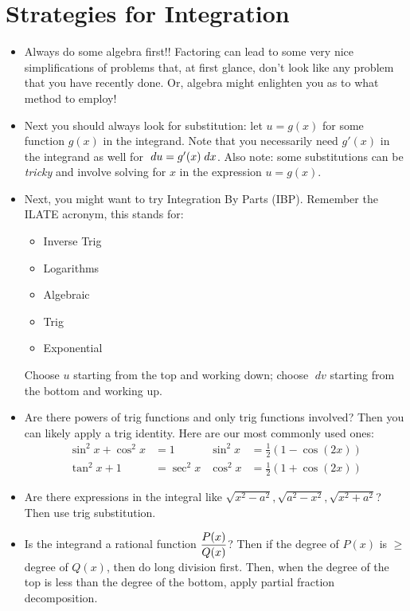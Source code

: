 \documentclass{ximera}
\theoremstyle{definition}
\newcommand{\du}{\; du}
\newcommand{\dv}{\; dv}
\begin{document}
\section{Strategies for Integration}
\begin{itemize}
	\item Always do some algebra first!! Factoring can lead to some very nice simplifications of problems that, at first glance, don't look like any problem that you have recently done. Or, algebra might enlighten you as to what method to employ!
	\item Next you should always look for substitution: let $u = g(x)$ for some function $g(x)$ in the integrand. Note that you necessarily need $g'(x)$ in the integrand as well for $\du = g'(x) \dx$. Also note: some substitutions can be \emph{tricky} and involve solving for $x$ in the expression $u=g(x)$.
	\item Next, you might want to try Integration By Parts (IBP). Remember the ILATE acronym, this stands for:
		\begin{itemize}
    		\item Inverse Trig
			\item Logarithms
			\item Algebraic
			\item Trig
			\item Exponential
		\end{itemize}
	Choose $u$ starting from the top and working down; choose $\dv$ starting from the bottom and working up.
	\item Are there powers of trig functions and only trig functions involved? Then you can likely apply a trig identity. Here are our most commonly used ones:
		\begin{align*}
			\sin^2 x + \cos^2 x &= 1 &\sin^2 x &= \frac{1}{2}\left(1-\cos(2x)\right) \\
			\tan^2 x + 1 &= \sec^2 x &\cos^2 x &= \frac{1}{2}\left(1 + \cos(2x) \right)
		\end{align*}

    \item Are there expressions in the integral like $\sqrt{x^2 - a^2}, \sqrt{a^2 - x^2}, \sqrt{x^2+a^2}$? Then use trig substitution.

	\item Is the integrand a rational function $\displaystyle\frac{P(x)}{Q(x)}$? Then if the degree of $P(x)$ is $\geq$ degree of $Q(x)$, then do long division first. Then, when the degree of the top is less than the degree of the bottom, apply partial fraction decomposition.
\end{itemize}
\end{document}
